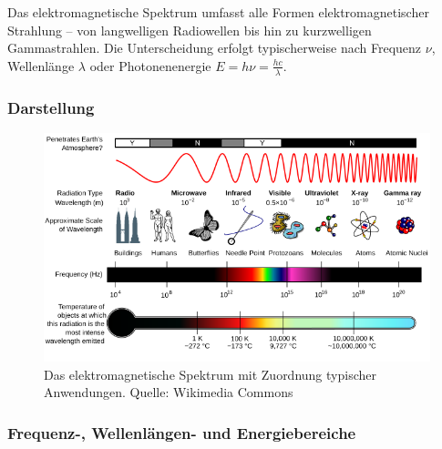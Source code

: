 Das elektromagnetische Spektrum umfasst alle Formen elektromagnetischer Strahlung – von langwelligen Radiowellen bis hin zu kurzwelligen Gammastrahlen. Die Unterscheidung erfolgt typischerweise nach Frequenz \(\nu\), Wellenlänge \(\lambda\) oder Photonenenergie \(E = h\nu = \frac{hc}{\lambda}\).

\subsubsection{Darstellung}

\begin{figure}[H]
	\centering
	\includegraphics[width=\linewidth]{bilder/spektrum.png}
	\caption{Das elektromagnetische Spektrum mit Zuordnung typischer Anwendungen. Quelle: Wikimedia Commons}
	\label{fig:em_spektrum}
\end{figure}

\subsubsection{Frequenz-, Wellenlängen- und Energiebereiche}

